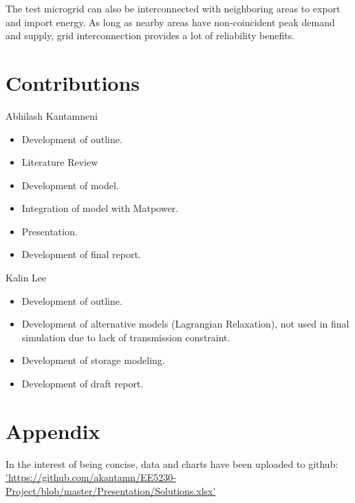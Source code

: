 \documentclass[a4paper]{article}
\begin{document}
The test microgrid can also be interconnected with neighboring areas to export and import energy. As long as nearby areas have non-coincident peak demand and supply, grid interconnection provides a lot of reliability benefits. 

\section{Contributions}

Abhilash Kantamneni

\begin{itemize}
\item Development of outline.
\item Literature Review
\item Development of model.
\item Integration of model with Matpower.
\item Presentation.
\item Development of final report.
\end{itemize}

Kalin Lee

\begin{itemize}
\item Development of outline.
\item Development of alternative models (Lagrangian Relaxation), not used in final simulation due to lack of transmission constraint.
\item Development of storage modeling.
\item Development of draft report.
\end{itemize}

\section{Appendix}

In the interest of being concise, data and charts have been uploaded to github: \url{'https://github.com/akantamn/EE5230-Project/blob/master/Presentation/Solutions.xlsx'}



\end{document}
